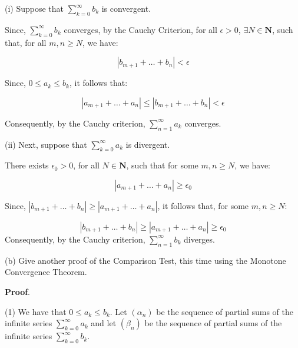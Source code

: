 \documentclass[10pt]{article}
\begin{document}
(i) Suppose that $ $$\displaystyle \sum _{k=0}^{\infty } b_{k}$ is convergent.

Since, $\displaystyle \sum _{k=0}^{\infty } b_{k}$ converges, by the Cauchy Criterion, for all $\displaystyle \epsilon  >0$, $\displaystyle \exists N\in \mathbf{N}$, such that, for all $\displaystyle m,n\geq N$, we have: 


\begin{equation*}
|b_{m+1} +\dotsc +b_{n} |< \epsilon 
\end{equation*}


Since, $\displaystyle 0\leq a_{k} \leq b_{k}$, it follows that:


\begin{equation*}
|a_{m+1} +\dotsc +a_{n} |\leq |b_{m+1} +\dotsc +b_{n} |< \epsilon 
\end{equation*}


Consequently, by the Cauchy criterion, $\displaystyle \sum _{n=1}^{\infty } a_{k}$ converges.

(ii) Next, suppose that $\displaystyle \sum _{k=0}^{\infty } a_{k}$ is divergent.



There exists $\displaystyle \epsilon _{0}  >0$, for all $\displaystyle N\in \mathbf{N}$, such that for some $\displaystyle m,n\geq N$, we have:


\begin{equation*}
|a_{m+1} +\dotsc +a_{n} |\geq \epsilon _{0}
\end{equation*}


Since, $\displaystyle |b_{m+1} +\dotsc +b_{n} |\geq |a_{m+1} +\dotsc +a_{n} |$, it follows that, for some $\displaystyle m,n\geq N$:




\begin{equation*}
|b_{m+1} +\dotsc +b_{n} |\geq |a_{m+1} +\dotsc +a_{n} |\geq \epsilon _{0}
\end{equation*}
Consequently, by the Cauchy criterion, $\displaystyle \sum _{n=1}^{\infty } b_{k}$ diverges.



(b) Give another proof of the Comparison Test, this time using the Monotone Convergence Theorem.



\textbf{Proof}.



(1) We have that $\displaystyle 0\leq a_{k} \leq b_{k}$. Let $\displaystyle ( \alpha _{n})$ be the sequence of partial sums of the infinite series $\displaystyle \sum _{k=0}^{\infty } a_{k}$ and let $\displaystyle ( \beta _{n})$ be the sequence of partial sums of the infinite series $\displaystyle \sum _{k=0}^{\infty } b_{k}$.
\end{document}
